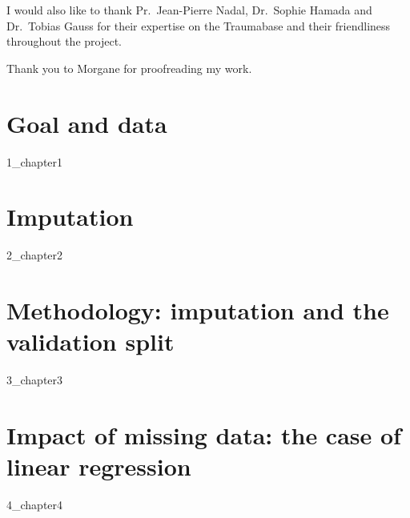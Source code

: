 \documentclass[12pt, a4paper]{memoir}
\begin{document}
I would also like to thank Pr.\ Jean-Pierre Nadal, Dr.\ Sophie Hamada and Dr.\ Tobias Gauss for their expertise on the Traumabase and their friendliness throughout the project.

Thank you to Morgane for proofreading my work.
\vspace*{\fill}
\newpage

\tableofcontents*
\vspace*{\fill}


\chapter{Goal and data}
\label{data}
 {1_chapter1}

\chapter{Imputation}
\label{imputation}
{2_chapter2}
		
\chapter{Methodology: imputation and the validation split}
\label{validation}
{3_chapter3}
		
		
\chapter{Impact of missing data: the case of linear regression}
\label{linreg}
{4_chapter4} 

\end{document}
